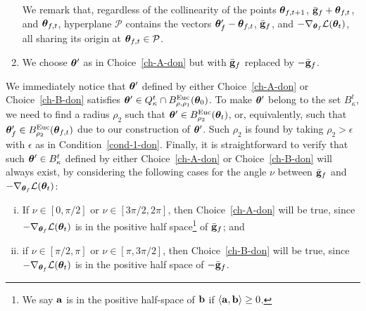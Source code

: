 \begin{enumerate}[{Choice} (A):]
We remark that, regardless of the collinearity of the points 
${\bm{\theta}}_{f,t+1}$, $\bar{\mathbf{g}}_f + {\bm{\theta}}_{f,t}$, and ${\bm{\theta}}_{f,t}$, hyperplane $\mathcal{P}$ contains the vectors ${\bm{\theta}}'_f-{\bm{\theta}}_{f,t}$, $\bar{\mathbf{g}}_f$, and $-\nabla_{{\bm{\theta}}_f}{\cal L}({\bm{\theta}}_t)$, all sharing its origin at ${\bm{\theta}}_{f,t}\in\mathcal{P}$. \label{ch-A-don}
%
\item  
%
%
We choose ${\bm{\theta}}'$ as in Choice~\eqref{ch-A-don} but with $\bar{\mathbf{g}}_f$ replaced by $-\bar{\mathbf{g}}_f$.
%
\label{ch-B-don}
%
%
\end{enumerate}
We immediately notice that ${\bm{\theta}}'$ defined by either Choice~\eqref{ch-A-don} or Choice~\eqref{ch-B-don} satisfies 
${\bm{\theta}}'\in Q^t_\kappa \cap B^{\mathrm{Euc}}_{\rho,\rho_1}({\bm{\theta}}_0)$. To make ${\bm{\theta}}'$ belong to the set $B^t_\kappa$, we need to find a radius $\rho_2$ such that ${\bm{\theta}}'\in B^{\mathrm{Euc}}_{\rho_2}({\bm{\theta}}_t)$, or, equivalently, such that ${\bm{\theta}}'_f\in B^{\mathrm{Euc}}_{\rho_2}({\bm{\theta}}_{f,t})$ due to our construction of ${\bm{\theta}}'$. Such $\rho_2$ is found by taking $\rho_2>\epsilon$ with $\epsilon$ as in Condition~\eqref{cond-1-don}. 
%
Finally, it is straightforward to verify that such ${\bm{\theta}}'\in B^t_\kappa$ defined by either Choice~\eqref{ch-A-don} or Choice~\eqref{ch-B-don} will always exist, by considering the following cases for the angle $\nu$ between $\bar{\mathbf{g}}_f$ and $-\nabla_{{\bm{\theta}}_f} {\cal L}({\bm{\theta}}_t)$:
\begin{enumerate}[(i)]
\item If $\nu \in [0, \pi/2]$ or $\nu \in [3\pi/2, 2\pi]$, then Choice~\eqref{ch-A-don} will be true, since $-\nabla_{{\bm{\theta}}_f} {\cal L}({\bm{\theta}}_t)$ is in the positive half space\footnote{We say $\mathbf{a}$ is in the positive half-space of $\mathbf{b}$ if $\langle \mathbf{a}, \mathbf{b} \rangle \geq 0$.} of $\bar{\mathbf{g}}_f$; and
\label{it-i-don}
\item if $\nu \in [\pi/2,\pi]$ or $\nu \in [\pi, 3\pi/2]$, then Choice~\eqref{ch-B-don} will be true, since $-\nabla_{{\bm{\theta}}_f} {\cal L}({\bm{\theta}}_t)$ is in the positive half space of $-\bar{\mathbf{g}}_f$.\label{it-ii-don}
\end{enumerate}

